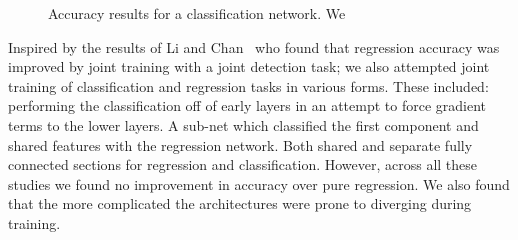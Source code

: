 \documentclass[11pt]{article} %
\begin{document}
\begin{figure}
\centering
{}%
\qquad
{}%
\caption{ Accuracy results for a classification network. We  }
\label{fig:classesRes}
\end{figure}

Inspired by the results of Li and Chan~\cite{Li2014} who found that regression accuracy was improved by joint training with a joint detection task; we also attempted joint training of classification and regression tasks in various forms.  These included: performing the classification off of early layers in an attempt to force gradient terms to the lower layers. A sub-net which classified the first component and shared features with the regression network. Both shared and separate fully connected sections for regression and classification. However, across all these studies we found no improvement in accuracy over pure regression. We also found that the more complicated the architectures were prone to diverging during training. 
\end{document}
